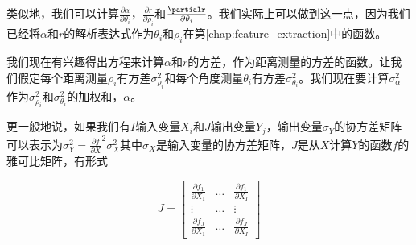 

类似地，我们可以计算$\frac{\partial\alpha}{\partial\theta_i}$，$\frac{\partial r}{\partial\rho_i}$和$\frac{\partialr}{\partial\theta_i}$。我们实际上可以做到这一点，因为我们已经将$\alpha$和$r$的解析表达式作为$\theta_i$和$\rho_i$在第\ref{chap:feature_extraction}中的函数。

我们现在有兴趣得出方程来计算$\alpha$和$r$的方差，作为距离测量的方差的函数。让我们假定每个距离测量$\rho_i$有方差$\sigma^2_{\rho_i}$和每个角度测量$\theta_i$有方差$\sigma^2_{\theta_i}$。我们现在要计算$\sigma^2_{\alpha}$作为$\sigma^2_{\rho_i}$和$\sigma^2_{\theta_i}$的加权和，$\alpha$。

更一般地说，如果我们有$I$输入变量$X_i$和$J$输出变量$Y_j$，输出变量$\sigma_Y$的协方差矩阵可以表示为$\sigma_Y^2=\frac{\partial f}{\partial X}^2\sigma_X^2$其中$\sigma_X$是输入变量的协方差矩阵，$J$是从$X$计算$Y$的函数$f$的雅可比矩阵，有形式

\begin{equation}
J=\left[
\begin{array}{ccc}
  \frac{\partial f_1}{\partial X_1} & \ldots & \frac{\partial f_1}{\partial X_I}\\
  \vdots & \ldots & \vdots\\
  \frac{\partial f_J}{\partial X_1} & \ldots & \frac{\partial f_J}{\partial X_I}
 \end{array}
 \right]
\end{equation}


